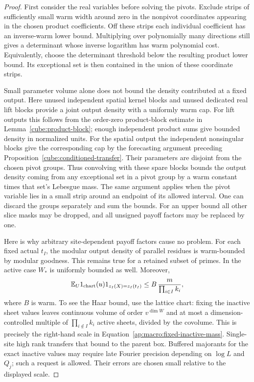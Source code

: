 \begin{proof}
First consider the real variables before solving the pivots.
Exclude strips of sufficiently small warm width around zero in the
nonpivot coordinates appearing in the chosen product coefficients.
Off these strips each individual coefficient has an inverse-warm
lower bound.  Multiplying over polynomially many directions still
gives a determinant whose inverse logarithm has warm polynomial cost.
Equivalently, choose the determinant threshold below the resulting
product lower bound.  Its exceptional set is then contained in the
union of these coordinate strips.

Small parameter volume alone does not bound the density contributed at
a fixed output.  Here unused independent spatial kernel blocks and
unused dedicated real lift blocks provide a joint output density with
a uniformly warm cap.  For lift outputs this follows from
the order-zero product-block estimate in
Lemma~\ref{cube:product-block}; enough independent product sums give
bounded density in normalized units.  For the spatial output the
independent nonsingular blocks give the corresponding cap by the
forecasting argument preceding Proposition~\ref{cube:conditioned-transfer}.
Their parameters are disjoint from the chosen pivot groups.  Thus
convolving with these spare blocks bounds the output density coming
from any exceptional set in a pivot group by a warm constant times
that set's Lebesgue mass.  The same argument applies when the pivot
variable lies in a small strip around an endpoint of its allowed
interval.  One can discard the groups separately and sum the bounds.
For an upper bound all other slice masks may be dropped, and all
unsigned payoff factors may be replaced by one.

Here is why arbitrary site-dependent payoff factors cause no problem.
For each fixed actual $t_I$, the modular output density of parallel
residues is warm-bounded by modular goodness.  This remains true for a
retained subset of primes.  In the active case $W_*$ is uniformly
bounded as well.  Moreover,
\begin{equation}\label{ap:macro:fixed-inactive-mass}
 \mathbb E_U 1_{\rm chart}(u)
          1_{z_I(X)=z_I(t_I)}
       \le B\,\frac{m}{\prod_{i\in I}k_i},
\end{equation}
where $B$ is warm.  To see the Haar bound, use the lattice chart:
fixing the inactive sheet values leaves continuous volume of order
$v^{\dim W}$ and at most a dimension-controlled multiple of
$\prod_{i\notin I}k_i$ active sheets, divided by the covolume.
This is precisely the right-hand scale in
Equation~\eqref{ap:macro:fixed-inactive-mass}.  Single-site high rank
transfers that bound to the parent box.  Buffered majorants for the
exact inactive values may require late Fourier precision depending on
$\log L$ and $Q_j$; such a request is allowed.  Their errors are chosen
small relative to the displayed scale.


\end{proof}
